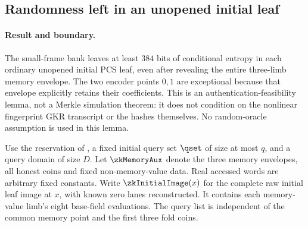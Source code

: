 \subsection{Randomness left in an unopened initial leaf}\label{note:zk-memory-leaf-entropy}

\paragraph{Result and boundary.} The small-frame bank leaves at least $384$ bits of conditional entropy in each ordinary unopened initial PCS leaf, even after revealing the entire three-limb memory envelope. The two encoder points $0,1$ are exceptional because that envelope explicitly retains their coefficients. This is an authentication-feasibility lemma, not a Merkle simulation theorem: it does not condition on the nonlinear fingerprint GKR transcript or the hashes themselves. No random-oracle assumption is used in this lemma.

Use the reservation of , a fixed initial query set $\qset$ of size at most $q$, and a query domain of size $D$. Let $\zkMemoryAux$ denote the three memory envelopes, all honest coins and fixed non-memory-value data. Real accessed words are arbitrary fixed constants. Write $\zkInitialImage(x)$ for the complete raw initial leaf image at $x$, with known zero lanes reconstructed. It contains each memory-value limb's eight base-field evaluations. The query list is independent of the common memory point and the first three fold coins.

